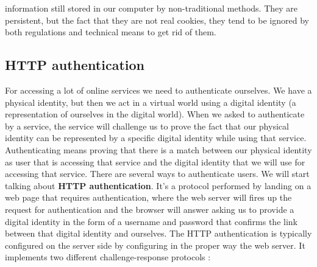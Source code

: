 \begin{itemize}
information still stored in our computer by non-traditional methods. They are persistent, but the fact that they are not real cookies, they tend to be ignored by both regulations and technical means to get rid of them.
\end{itemize}

\subsection{HTTP authentication}
For accessing a lot of online services we need to authenticate ourselves. We have a physical identity, but then we act in a virtual world using a digital identity (a representation of ourselves in the digital world). When we asked to authenticate by a service, the service will challenge us to prove the fact that our physical identity can be represented by a specific digital identity while using that service. Authenticating means proving that there is a match between our physical identity as user that is accessing that service and the digital identity that we will use for accessing that service. There are several ways to authenticate users. We will start talking about \textbf{HTTP authentication}. It's a protocol performed by landing on a web page that requires authentication, where the web server will fires up the request for authentication and the browser will answer asking us to provide a digital identity in the form of a username and password that confirms the link between that digital identity and ourselves. The HTTP authentication is typically configured on the server side by configuring in the proper way the web server. It implements two different challenge-response protocols :
